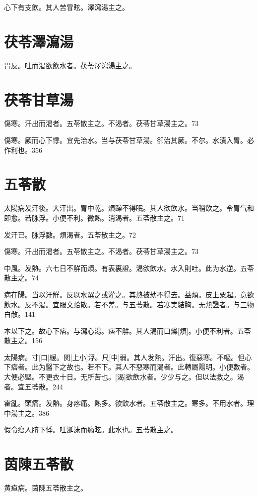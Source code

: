 \documentclass[12pt,oneside,UTF8,b5paper]{ctexbook}她她她她她她她
\begin{document}
心下有支飲。其人苦冒眩。澤瀉湯主之。

\section{茯苓澤瀉湯}

胃反。吐而渴欲飲水者。茯苓澤瀉湯主之。

\section{茯苓甘草湯}

傷寒。汗出而渴者。五苓散主之。不渴者。茯苓甘草湯主之。73

傷寒。厥而心下悸。宜先治水。当与茯苓甘草湯。卻治其厥。不尔。水漬入胃。必作利也。356

\section{五苓散}

太陽病发汗後。大汗出。胃中乾。煩躁不得眠。其人欲飲水。当稍飲之。令胃气和即愈。若脉浮。小便不利。微熱。消渴者。五苓散主之。71

发汗已。脉浮數。煩渴者。五苓散主之。72

傷寒。汗出而渴者。五苓散主之。不渴者。茯苓甘草湯主之。73

中風。发熱。六七日不觧而煩。有表裏證。渴欲飲水。水入則吐。此为水逆。五苓散主之。74

病在陽。当以汗觧。反以水潠之或灌之。其熱被劫不得去。益煩。皮上粟起。意欲飲水。反不渴。宜服文蛤散。若不差。与五苓散。若寒実結胸。无熱證者。与三物白散。141

本以下之。故心下痞。与瀉心湯。痞不觧。其人渴而口燥[煩]。小便不利者。五苓散主之。156

太陽病。寸[口]緩。関[上小]浮。尺[中]弱。其人发熱。汗出。復惡寒。不嘔。但心下痞者。此为醫下之故也。若不下。其人不惡寒而渴者。此轉屬陽明。小便數者。大便必堅。不更衣十日。无所苦也。[渴]欲飲水者。少少与之。但以法救之。渴者。宜五苓散。244

霍亂。頭痛。发熱。身疼痛。熱多。欲飲水者。五苓散主之。寒多。不用水者。理中湯主之。386

假令瘦人脐下悸。吐涎沫而癲眩。此水也。五苓散主之。

\section{茵陳五苓散}

黄疸病。茵陳五苓散主之。
\end{document}
